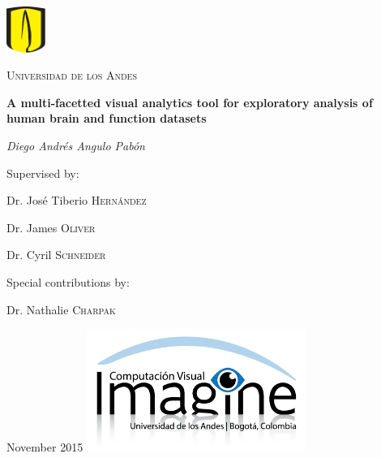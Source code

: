 \documentclass[12pt]{report}
\begin{document}
\begin{titlepage}


	\centering
	\includegraphics[height=1.5cm]{uniandes}\par\vspace{1cm}
	{\scshape\LARGE Universidad de los Andes \par}
	\vspace{1cm}
	{\LARGE\bfseries A multi-facetted visual analytics tool for exploratory analysis of human brain and function datasets \par}
	\vspace{2cm}
	{\Large\itshape Diego Andrés Angulo Pabón\par}
	\vfill
	Supervised by:\par
	Dr. José Tiberio \textsc{Hernández} \par
	Dr. James \textsc{Oliver} \par
	Dr. Cyril \textsc{Schneider} \par
	\vspace{1cm}
	Special contributions by: \par
	Dr. Nathalie \textsc{Charpak}\par			
	\vfill
	{\large November 2015}
	\vfill
	\includegraphics[height=4cm]{imagine}\par\vspace{1cm}
	
	
\end{titlepage}
\end{document}
